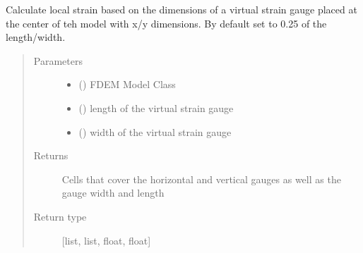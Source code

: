 \documentclass[letterpaper,10pt,english]{sphinxmanual}
\begin{document}

\begin{fulllineitems}
\label{\detokenize{openfdem:openfdem.complete_UCS_thread_pool_generators.set_strain_gauge}}
Calculate local strain based on the dimensions of a virtual strain gauge placed at the center of teh model with
x/y dimensions. By default set to 0.25 of the length/width.
\begin{quote}\begin{description}
\item[{Parameters}] \leavevmode\begin{itemize}
\item {} 
 ({\hyperref[\detokenize{openfdem:openfdem.openfdem.Model}]{}}) \textendash{} FDEM Model Class

\item {} 
 () \textendash{} length of the virtual strain gauge

\item {} 
 () \textendash{} width of the virtual strain gauge

\end{itemize}

\item[{Returns}] \leavevmode
Cells that cover the horizontal and vertical gauges as well as the gauge width and length

\item[{Return type}] \leavevmode
{[}list, list, float, float{]}

\end{description}\end{quote}

\end{fulllineitems}
\end{document}
